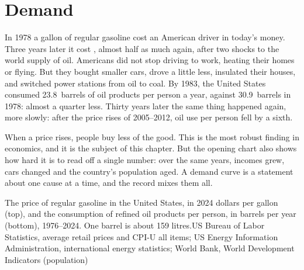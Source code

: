 \chapter{Demand}\label{ch:g10:demand}

In 1978 a gallon of regular gasoline cost an American driver  in today's money. Three years
later it cost , almost half as much again, after two shocks to the world supply of oil. Americans
did not stop driving to work, heating their homes or flying. But they bought smaller cars, drove a little
less, insulated their houses, and switched power stations from oil to coal. By 1983, the United States
consumed \qty{23.8}{barrels} of oil products per person a year, against \qty{30.9}{barrels} in 1978: almost a
quarter less. Thirty years later the same thing happened again, more slowly: after the price rises of 2005--2012,
oil use per person fell by a sixth.

When a price rises, people buy less of the good. This is the most robust finding in economics, and it is
the subject of this chapter. But the opening chart also shows how hard it is to read off a single number:
over the same years, incomes grew, cars changed and the country's population aged. A demand curve is a
statement about one cause at a time, and the record mixes them all.

\begin{openingchart}{The price of regular gasoline in the United States, in 2024 dollars per gallon (top), and
the consumption of refined oil products per person, in barrels per year (bottom), 1976--2024. One barrel is
about 159 litres.}{US Bureau of Labor Statistics, average retail prices and CPI-U all items; US Energy
Information Administration, international energy statistics; World Bank, World Development Indicators
(population)}
\end{openingchart}

